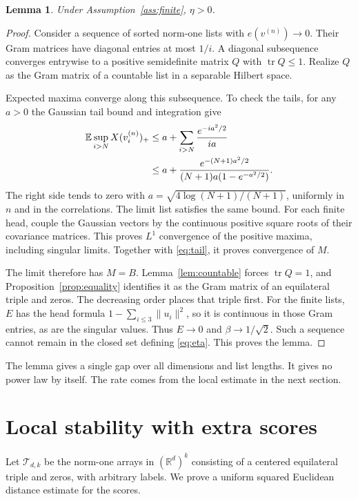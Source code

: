 \documentclass[11pt,reqno]{amsart}
\numberwithin{equation}{section}
\newtheorem{lemma}[theorem]{Lemma}
\theoremstyle{definition}
\theoremstyle{remark}
\newcommand{\E}{\mathbb E}
\newcommand{\R}{\mathbb R}
\newcommand{\cT}{\mathcal T}
\DeclareMathOperator{\tr}{tr}
\begin{document}
\begin{lemma}\label{lem:compactness}
Under Assumption~\ref{ass:finite}, $\eta>0$.
\end{lemma}
\begin{proof}
Consider a sequence of sorted norm-one lists with $e(v^{(n)})\to0$.
Their Gram matrices have diagonal entries at most $1/i$. A diagonal
subsequence converges entrywise to a positive semidefinite matrix
$Q$ with $\tr Q\le1$. Realize $Q$ as the Gram matrix of a countable
list in a separable Hilbert space.

Expected maxima converge along this subsequence. To check the tails,
for any $a>0$ the Gaussian tail bound and integration give
\begin{align}\label{eq:tail}
 \E\sup_{i>N}X(v_i^{(n)})_+
 &\le a+\sum_{i>N}\frac{e^{-ia^2/2}}{ia}\notag\\
 &\le a+\frac{e^{-(N+1)a^2/2}}
                   {(N+1)a(1-e^{-a^2/2})}.
\end{align}
The right side tends to zero with
$a=\sqrt{4\log(N+1)/(N+1)}$, uniformly in $n$ and in the
correlations. The limit list satisfies the same bound.
For each finite head, couple the Gaussian vectors by the continuous
positive square roots of their covariance matrices. This proves
$L^1$ convergence of the positive maxima, including singular limits.
Together with \eqref{eq:tail}, it proves convergence of $M$.

The limit therefore has $M=B$. Lemma~\ref{lem:countable} forces
$\tr Q=1$, and Proposition~\ref{prop:equality} identifies it as the
Gram matrix of an equilateral triple and zeros. The decreasing order
places that triple first. For the finite lists, $E$ has the head
formula $1-\sum_{i\le3}\|u_i\|^2$, so it is continuous in those
Gram entries, as are the singular values. Thus $E\to0$ and
$\beta\to1/\sqrt2$. Such a sequence cannot remain in the closed
set defining \eqref{eq:eta}. This proves the lemma.
\end{proof}

The lemma gives a single gap over all dimensions and list lengths.
It gives no power law by itself. The rate comes from the local
estimate in the next section.

\section{Local stability with extra scores}
Let $\cT_{d,k}$ be the norm-one arrays in $(\R^d)^k$ consisting
of a centered equilateral triple and zeros, with arbitrary labels.
We prove a uniform squared Euclidean distance estimate for the scores.
\end{document}
